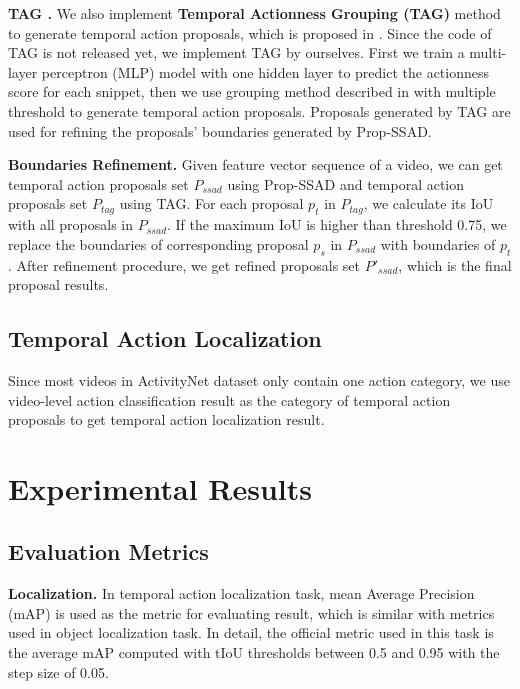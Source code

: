 \documentclass[10pt,twocolumn,letterpaper]{article}
\begin{document}
{\bf TAG \cite{xiong2017pursuit}.} We also implement {\bf Temporal Actionness Grouping (TAG)} method to generate temporal action proposals, which is proposed in \cite{xiong2017pursuit}. Since the code of TAG is not released yet, we implement TAG by ourselves. First we train a multi-layer perceptron (MLP) model with one hidden layer to predict the actionness score for each snippet, then we use grouping method described in \cite{xiong2017pursuit} with multiple threshold to generate temporal action proposals. Proposals generated by TAG are used for refining the proposals' boundaries generated by Prop-SSAD.

{\bf Boundaries Refinement.} Given feature vector sequence of a video, we can get  temporal action proposals set $P_{ssad}$ using Prop-SSAD and temporal action proposals set $P_{tag}$ using TAG. For each proposal $p_t$ in $P_{tag}$, we calculate its IoU with all proposals in $P_{ssad}$. If the maximum IoU is higher than threshold 0.75, we replace the boundaries of corresponding proposal $p_s$ in $P_{ssad}$ with boundaries of $p_t$. After refinement procedure, we get refined proposals set $P'_{ssad}$, which is the final proposal results.


\subsection{Temporal Action Localization}

Since most videos in ActivityNet dataset only contain one action category, we use video-level action classification result as the category of temporal action proposals to get temporal action localization result.

\section{Experimental Results}



\subsection{Evaluation Metrics}

{\bf Localization.} In temporal action localization task, mean Average Precision (mAP) is used as the metric for evaluating result, which is similar with metrics used in object localization task. In detail, the official metric used in this task is the average mAP computed with tIoU thresholds  between 0.5 and 0.95 with the step size of 0.05.
\end{document}
